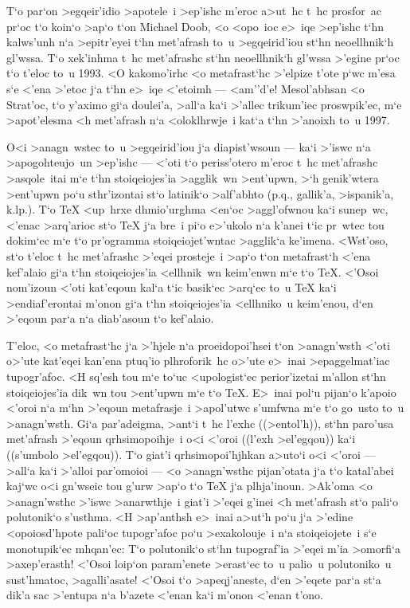 T`o par`on >egqeir'idio >apotele~i >ep'ishc m'eroc a>ut~hc t~hc
prosfor~ac pr`oc t`o koin`o >ap`o t`on {\rm Michael Doob}, <o <opo~ioc
e>~iqe >ep'ishc t`hn kalws'unh n`a >epitr'eyei t`hn met'afrash to~u
>egqeirid'iou st`hn neoellhnik`h gl'wssa.  T`o xek'inhma t~hc
met'afrashc st`hn neoellhnik`h gl'wssa >'egine pr`oc t`o t'eloc to~u
1993.  <O kakomo'irhc <o metafrast`hc >'elpize t'ote p`wc m'esa s`e
<'ena >'etoc j`a t`hn e>~iqe <'etoimh --- <am''\NB d'e!  Mesol'abhsan <o
Strat'oc, t`o y'aximo gi`a doulei'a, >all`a ka`i >'allec trikum'iec
proswpik'ec, m`e >apot'elesma <h met'afrash n`a <oloklhrwje~i kat`a t`hn
>'anoixh to~u 1997.

O<i >anagn~wstec to~u >egqeirid'iou j`a diapist'wsoun --- ka`i >'iswc
n`a >apogohteujo~un >ep'ishc --- <'oti t`o periss'otero m'eroc t~hc
met'afrashc >asqole~itai m`e t`hn stoiqeiojes'ia >agglik~wn >ent'upwn,
>`h genik'wtera >ent'upwn po`u sthr'izontai st`o latinik`o >alf'abhto
(p.q., gallik'a, >ispanik'a, k.lp.).  T`o {\rm \TeX} <up~hrxe
dhmio'urghma <en`oc >aggl'ofwnou ka`i sunep~wc, <'enac >arq'arioc st`o
{\rm \TeX} j`a bre~i pi`o e>'ukolo n`a k'anei t`ic pr~wtec tou dokim`ec
m`e t`o pr'ogramma stoiqeiojet'wntac >ag\-gli\-k`a ke'imena.  <Wst'oso,
st`o t'eloc t~hc met'afrashc >'eqei prosteje~i >ap`o t`on metafrast`h
<'ena kef'alaio gi`a t`hn stoiqeiojes'ia <ellhnik~wn keim'enwn m`e t`o
{\rm \TeX}\null.  <'Osoi nom'izoun <'oti kat'eqoun kal`a t`ic basik`ec
>arq`ec to~u {\rm \TeX} ka`i >endiaf'erontai m'onon gi`a t`hn
stoiqeiojes'ia <ellhniko~u keim'enou, d`en >'eqoun par`a n`a diab'asoun
t`o kef'alaio.

T'eloc, <o metafrast`hc j`a >'hjele n`a proeidopoi'hsei t`on >anagn'wsth
<'oti o>'ute kat'eqei kan'ena ptuq'io plhroforik~hc o>'ute e>~inai
>epaggelmat'iac tupogr'afoc.  <H sq'esh tou m`e to`uc <upologist`ec
perior'izetai m'allon st`hn stoiqeiojes'ia dik~wn tou >ent'upwn m`e t`o
{\rm \TeX}\null.  E>~inai pol`u pijan`o k'apoio <'oroi n`a m`hn >'eqoun
metafrasje~i >apol'utwc s'umfwna m`e t`o go~usto to~u >anagn'wsth.  Gi`a
par'adeigma, >ant`i t~hc l'exhc ((>entol'h)), st`hn paro'usa met'afrash
>'eqoun qrhsimo\-poihje~i o<i <'oroi ((l'exh >el'egqou)) ka`i
((s'umbolo >el'eg\-qou)).  T`o giat'i qrhsimopoi'hjhkan a>uto`i o<i
<'oroi --- >all`a ka`i >'alloi par'omoioi --- <o >anagn'wsthc
pijan'otata j`a t`o katal'abei kaj`wc o<i gn'wseic tou g'urw >ap`o t`o
{\rm \TeX} j`a plhja'inoun.  >Ak'oma <o >anagn'wsthc >'iswc >anarwthje~i
giat'i >'eqei g'inei <h met'afrash st`o pali`o polutonik`o s'usthma.  <H
>ap'anthsh e>~inai a>ut`h po`u j`a >'edine <opoiosd'hpote pali`oc
tupogr'afoc po`u >exakolouje~i n`a stoiqeiojete~i s`e monotupik`ec
mhqan'ec: {\tengs T`o polutonik`o st`hn tupograf'ia >'eqei m'ia
>omorfi`a >axep'erasth!}  <'Osoi loip`on param'enete >erast`ec to~u
palio~u polutoniko~u sust'hmatoc, >agal\-li'a\-sa\-te!  <'Osoi t`o
>apeqj'aneste, d`en >'eqete par`a st`a dik'a sac >'entupa n`a b'azete
<'enan ka`i m'onon <'enan t'ono.

